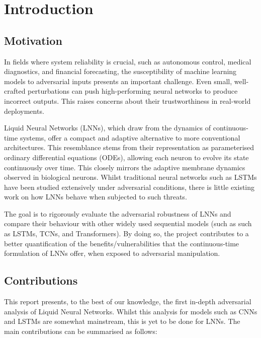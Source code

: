 \chapter{Introduction}

\section{Motivation}

In fields where system reliability is crucial, such as autonomous control, medical diagnostics, and financial forecasting, the susceptibility of machine learning models to adversarial inputs presents an important challenge. Even small, well-crafted perturbations can push high-performing neural networks to produce incorrect outputs. This raises concerns about their trustworthiness in real-world deployments.

Liquid Neural Networks (LNNs), which draw from the dynamics of continuous-time systems, offer a compact and adaptive alternative to more conventional architectures. This resemblance stems from their representation as parameterised ordinary differential equations (ODEs), allowing each neuron to evolve its state continuously over time. This closely mirrors the adaptive membrane dynamics observed in biological neurons. Whilst traditional neural networks such as LSTMs have been studied extensively under adversarial conditions, there is little existing work on how LNNs behave when subjected to such threats. 

The goal is to rigorously evaluate the adversarial robustness of LNNs and compare their behaviour with other widely used sequential models (such as such as LSTMs, TCNs, and Transformers). By doing so, the project contributes to a better quantification of the benefits/vulnerabilities that the continuous-time formulation of LNNs offer, when exposed to adversarial manipulation.

\section{Contributions}

This report presents, to the best of our knowledge, the first in-depth adversarial analysis of Liquid Neural Networks. Whilst this analysis for models such as CNNs and LSTMs are somewhat mainstream, this is yet to be done for LNNs. The main contributions can be summarised as follows:

